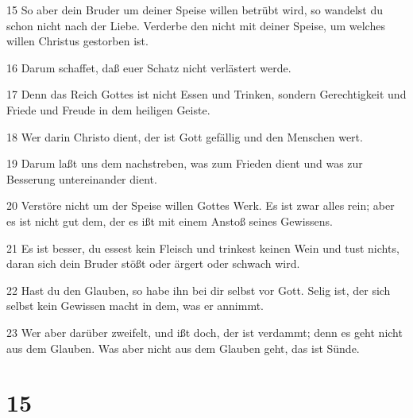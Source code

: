 \par 15 So aber dein Bruder um deiner Speise willen betrübt wird, so wandelst du schon nicht nach der Liebe. Verderbe den nicht mit deiner Speise, um welches willen Christus gestorben ist.
\par 16 Darum schaffet, daß euer Schatz nicht verlästert werde.
\par 17 Denn das Reich Gottes ist nicht Essen und Trinken, sondern Gerechtigkeit und Friede und Freude in dem heiligen Geiste.
\par 18 Wer darin Christo dient, der ist Gott gefällig und den Menschen wert.
\par 19 Darum laßt uns dem nachstreben, was zum Frieden dient und was zur Besserung untereinander dient.
\par 20 Verstöre nicht um der Speise willen Gottes Werk. Es ist zwar alles rein; aber es ist nicht gut dem, der es ißt mit einem Anstoß seines Gewissens.
\par 21 Es ist besser, du essest kein Fleisch und trinkest keinen Wein und tust nichts, daran sich dein Bruder stößt oder ärgert oder schwach wird.
\par 22 Hast du den Glauben, so habe ihn bei dir selbst vor Gott. Selig ist, der sich selbst kein Gewissen macht in dem, was er annimmt.
\par 23 Wer aber darüber zweifelt, und ißt doch, der ist verdammt; denn es geht nicht aus dem Glauben. Was aber nicht aus dem Glauben geht, das ist Sünde.

\chapter{15}

